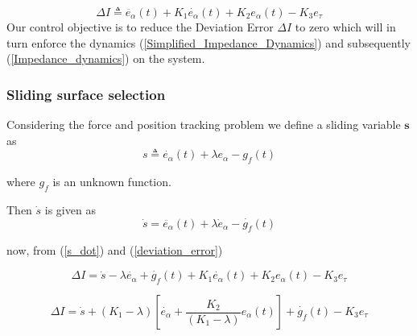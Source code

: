 \documentclass[letterpaper, 10 pt, conference]{ieeeconf}  %
\begin{document}
\begin{equation} \label{deviation_error}
   \Delta I  \triangleq \ddot{e_\alpha}(t)  + {K_1}  \dot{e_\alpha}(t) +  {K_2} {e_\alpha}(t) - {K_3} e_{\tau}
\end{equation}
Our control objective is to reduce the Deviation Error $\Delta I$ to zero which will in turn enforce the dynamics (\ref{Simplified_Impedance_Dynamics}) and subsequently (\ref{Impedance_dynamics}) on the system.
\subsubsection{Sliding surface selection}

Considering the force and position tracking problem we define a sliding variable $\mathbf{s}$ as
\begin{equation} \label{s}
    s \triangleq \dot{e_\alpha}(t) + \lambda {e_\alpha} - {g_f}(t)
\end{equation}

where $g_f$ is an unknown function.

Then $\dot s$ is given as
\begin{equation} \label{s_dot}
    \dot s = \ddot{e_\alpha}(t) + \lambda {\dot e_\alpha} - \dot {g_f}(t)
\end{equation}

now, from (\ref{s_dot}) and (\ref{deviation_error})


\begin{equation} \label{devsol1}
    \Delta I = \dot s - \lambda \dot{e_\alpha} + \dot{g_f}(t) + K_1 \dot{e_\alpha}(t) + K_2 e_\alpha(t) - K_3 e_{\tau}
\end{equation}

\begin{equation}\label{devsol2}
    \Delta I = \dot s + (K_1 - \lambda) [\dot{e_\alpha} + \frac{K_2}{(K_1 - \lambda)} e_\alpha(t)] 
    + \dot{g_f}(t) - K_3 e_{\tau}
\end{equation}
\end{document}
